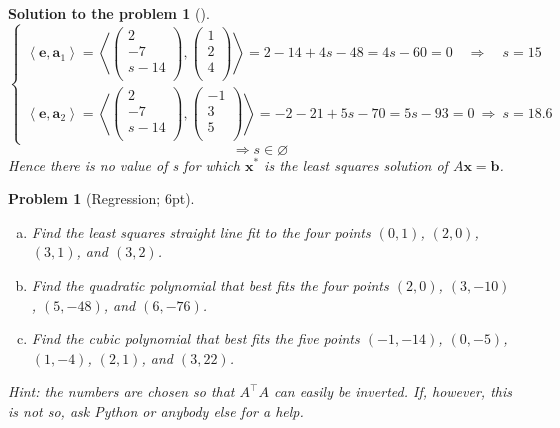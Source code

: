 \documentclass[12pt,a4]{article}
\newtheorem{problem}{Problem}
\newtheorem{solution}{Solution to the problem}
\newcommand{\ba}{{\mathbf a}}
\newcommand{\bb}{{\mathbf b}}
\newcommand{\be}{{\mathbf e}}
\newcommand{\bx}{{\mathbf x}}
\newcommand{\sprod}[2]{\left \langle #1, #2 \right \rangle}
\begin{document}
\begin{solution}[]
\[\]
\[
\left\{\begin{matrix}
\sprod{\be}{\ba_1} = 
\sprod{
\begin{pmatrix}
2 \\ -7 \\ s-14 \\
\end{pmatrix}
}{
\begin{pmatrix}
1 \\ 2 \\ 4 \\
\end{pmatrix}
}
= 2 - 14  + 4s - 48 = 4s - 60 = 0 \quad \Rightarrow \quad s = 15 \\
\sprod{\be}{\ba_2} = 
\sprod{
\begin{pmatrix}
2 \\ -7 \\ s-14 \\
\end{pmatrix}
}{
\begin{pmatrix}
-1 \\ 3 \\ 5 \\
\end{pmatrix}
}
= -2 - 21  + 5s - 70 = 5s - 93 = 0 ~ \Rightarrow ~ s = 18.6
\end{matrix}\right.
\]
\[
\Rightarrow s \in \varnothing 
\]
Hence there is no value of s for which $\bx^*$ is the least squares solution of $A\bx=\bb$.\\
\end{solution}


\begin{problem}[Regression; 6pt]\rm
	\begin{enumerate}[(a)]
		\item  Find the least squares straight line fit to the four points $(0,1)$, $(2,0)$, $(3,1)$, and $(3,2)$.
		\item  Find the quadratic polynomial that best fits the four points $(2,0)$, $(3,-10)$, $(5,-48)$, and $(6,-76)$.
		\item  Find the cubic polynomial that best fits the five points $(-1,-14)$, $(0,-5)$, $(1,-4)$, $(2,1)$, and $(3,22)$.
	\end{enumerate}
	{\small{\textsf{Hint: the numbers are chosen so that $A^\top A$ can easily be inverted. If, however, this is not so, ask Python or anybody else for a help.}}}
\end{problem}
\end{document}

